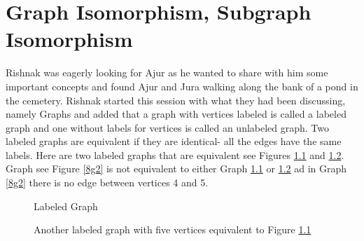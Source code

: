 \chapter{Graph Isomorphism, Subgraph Isomorphism}

Rishnak was eagerly looking for Ajur as he wanted to share with him some important concepts and found Ajur and Jura walking along the bank of a pond in the cemetery. Rishnak started this session with what they had been discussing, namely Graphs and added that a graph with vertices labeled is called a labeled graph and one without labels for vertices is called an unlabeled graph. Two labeled graphs are equivalent if they are identical- all the edges have the same labels. Here are two labeled graphs that are equivalent see Figures \ref{8g1} and \ref{8g11}. Graph see Figure \ref{8g2} is not equivalent to either Graph \ref{8g1} or \ref{8g11} ad in Graph \ref{8g2} there is no edge between vertices 4 and 5.
\begin{figure}
\begin{center}
\caption{Labeled Graph}\label{8g1}
\end{center}

\end{figure}
\begin{figure}
\begin{center}
\caption{ Another labeled graph with five vertices equivalent to Figure \ref{8g1}}\label{8g11}
\end{center}
\end{figure}

